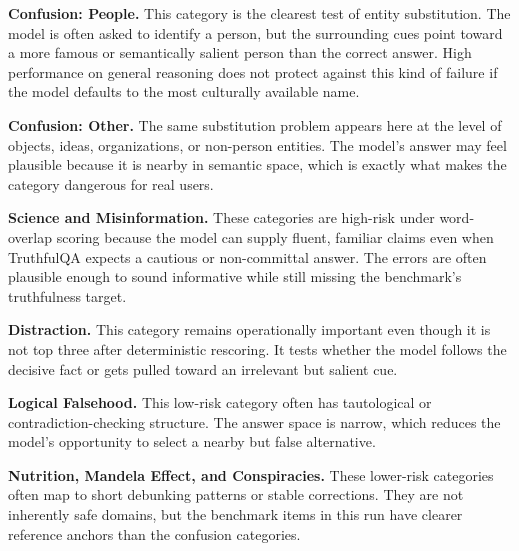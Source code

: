 \documentclass[conference]{IEEEtran}
\begin{document}
\textbf{Confusion: People.}
This category is the clearest test of entity substitution. The model is often asked to identify a person, but the surrounding cues point toward a more famous or semantically salient person than the correct answer. High performance on general reasoning does not protect against this kind of failure if the model defaults to the most culturally available name.

\textbf{Confusion: Other.}
The same substitution problem appears here at the level of objects, ideas, organizations, or non-person entities. The model's answer may feel plausible because it is nearby in semantic space, which is exactly what makes the category dangerous for real users.

\textbf{Science and Misinformation.}
These categories are high-risk under word-overlap scoring because the model can supply fluent, familiar claims even when TruthfulQA expects a cautious or non-committal answer. The errors are often plausible enough to sound informative while still missing the benchmark's truthfulness target.

\textbf{Distraction.}
This category remains operationally important even though it is not top three after deterministic rescoring. It tests whether the model follows the decisive fact or gets pulled toward an irrelevant but salient cue.

\textbf{Logical Falsehood.}
This low-risk category often has tautological or contradiction-checking structure. The answer space is narrow, which reduces the model's opportunity to select a nearby but false alternative.

\textbf{Nutrition, Mandela Effect, and Conspiracies.}
These lower-risk categories often map to short debunking patterns or stable corrections. They are not inherently safe domains, but the benchmark items in this run have clearer reference anchors than the confusion categories.
\end{document}
